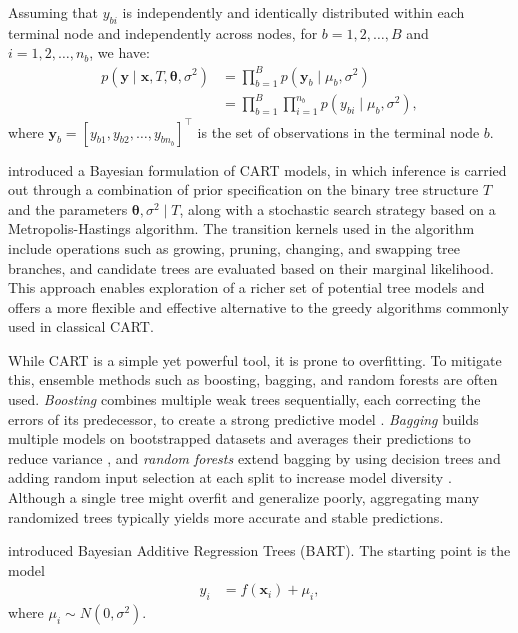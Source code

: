Assuming that \( y_{bi} \) is independently and identically distributed within each terminal node and independently across nodes, for \( b = 1, 2, \dots, B \) and \( i = 1, 2, \dots, n_b \), we have:
\begin{align*}
	p(\mathbf{y} \mid \mathbf{x}, T, \boldsymbol{\theta}, \sigma^2) &= \prod_{b=1}^B p(\mathbf{y}_b \mid \mu_b,\sigma^2) \\
	&= \prod_{b=1}^B \prod_{i=1}^{n_b} p(y_{bi} \mid \mu_b,\sigma^2),
\end{align*}
where $\mathbf{y}_b=[y_{b1}, y_{b2}, \dots, y_{bn_b}]^{\top}$ is the set of observations in the terminal node $b$.

\cite{chipman1998bayesian} introduced a Bayesian formulation of CART models, in which inference is carried out through a combination of prior specification on the binary tree structure \( T \) and the parameters \( \boldsymbol{\theta}, \sigma^2 \mid T \), along with a stochastic search strategy based on a Metropolis-Hastings algorithm. The transition kernels used in the algorithm include operations such as growing, pruning, changing, and swapping tree branches, and candidate trees are evaluated based on their marginal likelihood. This approach enables exploration of a richer set of potential tree models and offers a more flexible and effective alternative to the greedy algorithms commonly used in classical CART. 

While CART is a simple yet powerful tool, it is prone to overfitting. To mitigate this, ensemble methods such as boosting, bagging, and random forests are often used. \textit{Boosting} combines multiple weak trees sequentially, each correcting the errors of its predecessor, to create a strong predictive model \cite{freund1997decision}. \textit{Bagging} builds multiple models on bootstrapped datasets and averages their predictions to reduce variance \cite{breiman1996bagging}, and \textit{random forests} extend bagging by using decision trees and adding random input selection at each split to increase model diversity \cite{breiman2001random}. Although a single tree might overfit and generalize poorly, aggregating many randomized trees typically yields more accurate and stable predictions.

\cite{chipman2010bart} introduced Bayesian Additive Regression Trees (BART). The starting point is the model
\begin{align*}
	y_i &= f(\mathbf{x}_i) + \mu_i,
\end{align*}
where \( \mu_i \sim N(0, \sigma^2) \).

